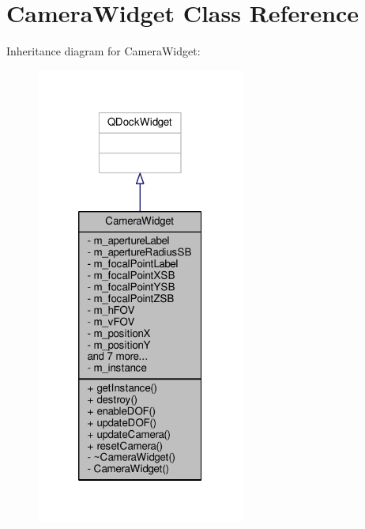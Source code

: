 \hypertarget{class_camera_widget}{\section{Camera\-Widget Class Reference}
\label{class_camera_widget}
}


Inheritance diagram for Camera\-Widget\-:
\nopagebreak
\begin{figure}[H]
\begin{center}
\leavevmode
\includegraphics[width=194pt]{class_camera_widget__inherit__graph}
\end{center}
\end{figure}


